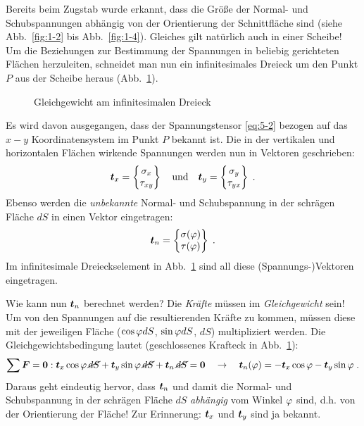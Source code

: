 Bereits beim Zugstab wurde erkannt, dass die Größe der Normal- und Schubspannungen abhängig von der Orientierung der Schnittfläche sind (siehe Abb.~\ref{fig:1-2} bis Abb.~\ref{fig:1-4}).
Gleiches gilt natürlich auch in einer Scheibe!
Um die Beziehungen zur Bestimmung der Spannungen in beliebig gerichteten Flächen herzuleiten, schneidet man nun ein infinitesimales Dreieck um den Punkt $P$ aus der Scheibe heraus (Abb.~\ref{fig:5-3}). 
%
\begin{figure}[h!]
	\centering
	
	\caption{Gleichgewicht am infinitesimalen Dreieck}
	\label{fig:5-3}
\end{figure}
%
Es wird davon ausgegangen, dass der Spannungstensor \eqref{eq:5-2} bezogen auf das $x-y$ Koordinatensystem im Punkt $P$ bekannt ist.
Die in der vertikalen und horizontalen Flächen wirkende Spannungen werden nun in Vektoren geschrieben:
%
\begin{equation}
	\boldsymbol{t}_x = \begin{Bmatrix}
	\sigma_x \\ \tau_{xy}
	\end{Bmatrix} \quad \text{und} \quad
	\boldsymbol{t}_y = \begin{Bmatrix}
	\sigma_y \\ \tau_{yx}
	\end{Bmatrix} \; .
	\label{eq5-2a:}
\end{equation}
%
Ebenso werden die \emph{unbekannte} Normal- und Schubspannung in der schrägen Fläche $dS$ in einen Vektor eingetragen:
%
\begin{equation}
\boldsymbol{t}_n = \begin{Bmatrix}
\sigma(\varphi) \\ \tau(\varphi) 
\end{Bmatrix} \; .
\label{eq:5-2b}
\end{equation}
% 
Im infinitesimale Dreieckselement in Abb.~\ref{fig:5-3} sind all diese (Spannungs-)Vektoren eingetragen.

Wie kann nun $\boldsymbol{t}_n$ berechnet werden?
Die \emph{Kräfte} müssen im \emph{Gleichgewicht} sein!
Um von den Spannungen auf die resultierenden Kräfte zu kommen, müssen diese mit der jeweiligen Fläche ($\cos\varphi dS$, $\sin\varphi dS$, $dS$) multipliziert werden.
Die Gleichgewichtsbedingung lautet (geschlossenes Krafteck in Abb.~\ref{fig:5-3}):
%
\begin{equation}
	\sum\boldsymbol{F}=\boldsymbol{0}: \boldsymbol{t}_x\cos\varphi\,\cancel{dS} + \boldsymbol{t}_y\sin\varphi\,\cancel{dS} +\boldsymbol{t}_n\,\cancel{dS} = \boldsymbol{0} \quad \rightarrow \quad \boldsymbol{t}_n(\varphi) = -\boldsymbol{t}_x\cos\varphi - \boldsymbol{t}_y\sin\varphi \; .
	\label{eq:5-3}
\end{equation}
%
Daraus geht eindeutig hervor, dass $\boldsymbol{t}_n$ und damit die Normal- und Schubspannung in der schrägen Fläche $dS$ \emph{abhängig} vom Winkel $\varphi$  sind, d.h. von der Orientierung der Fläche!
Zur Erinnerung: $\boldsymbol{t}_x$ und $\boldsymbol{t}_y$ sind ja bekannt.

